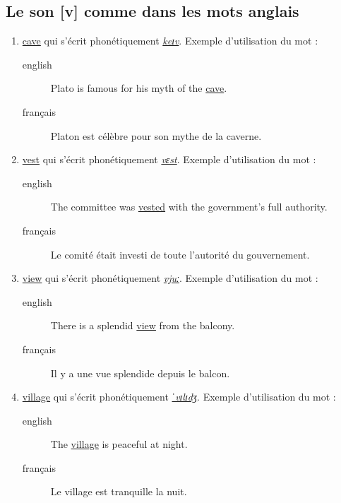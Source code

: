 \documentclass[12pt,a4paper]{book}
\begin{document}
\subsection{Le son [v] comme dans les mots anglais}
\label{sec:org1c51acc}
\begin{enumerate}
\item \href{http://www.wordreference.com/enfr/cave}{cave} qui s'écrit phonétiquement \href{https://en.oxforddictionaries.com/definition/cave}{\emph{keɪv}}. Exemple d'utilisation du mot :
\begin{description}
\item[{english}] \textenglish{Plato is famous for his myth of the \href{https://youtu.be/kZQbkzwwinI}{cave}.}
\item[{français}] Platon est célèbre pour son mythe de la caverne.
\end{description}
\item \href{http://www.wordreference.com/enfr/vest}{vest} qui s'écrit phonétiquement \href{https://en.oxforddictionaries.com/definition/vest}{\emph{vɛst}}. Exemple d'utilisation du mot :
\begin{description}
\item[{english}] \textenglish{The committee was \href{https://youtu.be/E4cjvxydHuU}{vested} with the government's full
authority.}
\item[{français}] Le comité était investi de toute l'autorité du
gouvernement.
\end{description}
\item \href{http://www.wordreference.com/enfr/view}{view} qui s'écrit phonétiquement \href{https://en.oxforddictionaries.com/definition/view}{\emph{vjuː}}. Exemple d'utilisation du mot :
\begin{description}
\item[{english}] \textenglish{There is a splendid \href{https://youtu.be/gODvA\_SdXCY}{view} from the balcony.}
\item[{français}] Il y a une vue splendide depuis le balcon.
\end{description}
\item \href{http://www.wordreference.com/enfr/village}{village} qui s'écrit phonétiquement \href{https://en.oxforddictionaries.com/definition/village}{\emph{ˈvɪlɪdʒ}}. Exemple d'utilisation du mot :
\begin{description}
\item[{english}] \textenglish{The \href{https://youtu.be/Xq8mt6WuD-E}{village} is peaceful at night.}
\item[{français}] Le village est tranquille la nuit.
\end{description}
\end{enumerate}
\end{document}
